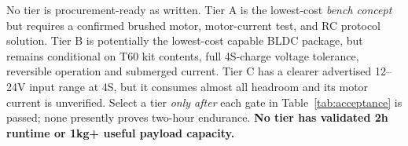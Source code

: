 No tier is procurement-ready as written. Tier A is the lowest-cost \emph{bench concept} but requires a confirmed brushed motor, motor-current test, and RC protocol solution. Tier B is potentially the lowest-cost capable BLDC package, but remains conditional on T60 kit contents, full 4S-charge voltage tolerance, reversible operation and submerged current. Tier C has a clearer advertised 12--24V input range at 4S, but it consumes almost all headroom and its motor current is unverified. Select a tier \emph{only after} each gate in Table~\ref{tab:acceptance} is passed; none presently proves two-hour endurance. \textbf{No tier has validated 2h runtime or 1kg+ useful payload capacity.}

\clearpage
\printbibliography[title={References (IEEE numbered source index)}]

